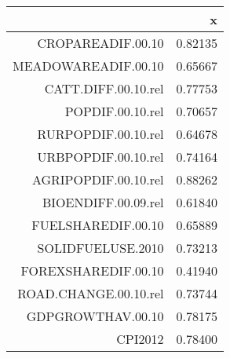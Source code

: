 \begin{table}[ht]
\centering
\begin{tabular}{rr}
  \hline
 & x \\ 
  \hline
CROPAREADIF.00.10 & 0.82135 \\ 
  MEADOWAREADIF.00.10 & 0.65667 \\ 
  CATT.DIFF.00.10.rel & 0.77753 \\ 
  POPDIF.00.10.rel & 0.70657 \\ 
  RURPOPDIF.00.10.rel & 0.64678 \\ 
  URBPOPDIF.00.10.rel & 0.74164 \\ 
  AGRIPOPDIF.00.10.rel & 0.88262 \\ 
  BIOENDIFF.00.09.rel & 0.61840 \\ 
  FUELSHAREDIF.00.10 & 0.65889 \\ 
  SOLIDFUELUSE.2010 & 0.73213 \\ 
  FOREXSHAREDIF.00.10 & 0.41940 \\ 
  ROAD.CHANGE.00.10.rel & 0.73744 \\ 
  GDPGROWTHAV.00.10 & 0.78175 \\ 
  CPI2012 & 0.78400 \\ 
   \hline
\end{tabular}
\label{tab:kmoKriterium}
\end{table}
